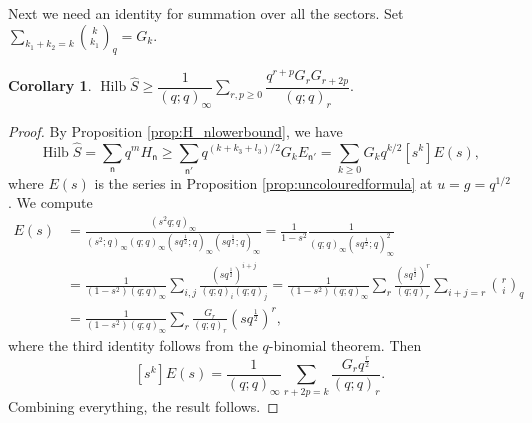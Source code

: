\documentclass[11pt]{amsart}
\newtheorem{corollary}[theorem]{Corollary}
\theoremstyle{definition}
\theoremstyle{remark}
\begin{document}
Next we need an identity for summation over all the sectors.
Set $\sum_{k_1+k_2=k}\binom{k}{k_1}_q=G_k$.
\begin{corollary}\label{cor:lowerboundS}
$\operatorname{Hilb}\widehat{S}\geq \dfrac{1}{(q;q)_{\infty}}\displaystyle\sum\limits_{r,p\geq 0}\dfrac{q^{r+p}G_r G_{r+2p}}{(q;q)_r}.	$
\end{corollary}
\begin{proof}
By Proposition \ref{prop:H_nlowerbound}, we have
\[\operatorname{Hilb}\widehat{S}=\sum_{\mathsf{n}}q^mH_{\mathsf{n}}\geq \sum_{\mathsf n'}q^{(k+k_3+l_3)/2}G_kE_{\mathsf{n}'}=\sum_{k\geq 0}G_kq^{k/2}[s^k]E(s),\]
where $E(s)$ is the series in Proposition \ref{prop:uncolouredformula} at $u=g=q^{1/2}$.
We compute
\begin{align*}
E(s)&=\frac{(s^2q;q)_{\infty}}{(s^2;q)_{\infty}(q;q)_{\infty}(sq^{\frac12};q)_{\infty}(sq^{\frac12};q)_{\infty}}=\frac{1}{1-s^2}\frac{1}{(q;q)_{\infty}(sq^{\frac12};q)_{\infty}^2}\\
&=\frac{1}{(1-s^2)(q;q)_{\infty}}\sum_{i,j}\frac{(sq^{\frac12})^{i+j}}{(q;q)_i(q;q)_j}=\frac{1}{(1-s^2)(q;q)_{\infty}}\sum_r\frac{(sq^{\frac12})^{r}}{(q;q)_r}\sum_{i+j=r}\binom{r}{i}_q\\
&=\frac{1}{(1-s^2)(q;q)_{\infty}}\sum_r\frac{G_r}{(q;q)_r}	(sq^{\frac12})^r,
\end{align*}
where the third identity follows from the $q$-binomial theorem. Then
\[[s^k]E(s)=\frac{1}{(q;q)_{\infty}}\sum_{r+2p=k}\frac{G_r q^{\frac{r}{2}}}{(q;q)_r}.\]
Combining everything, the result follows. 
\end{proof}
\end{document}
